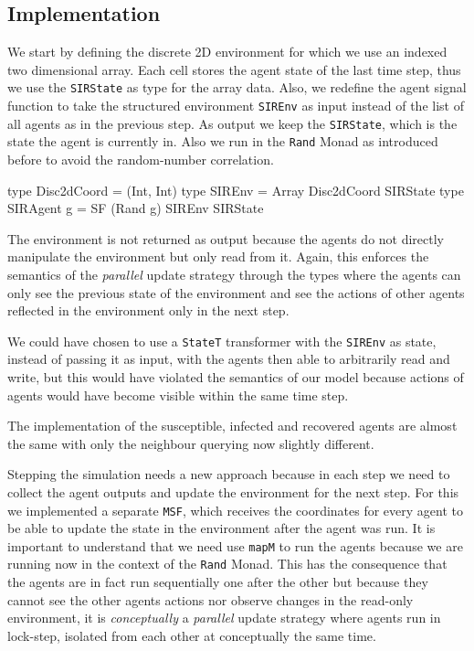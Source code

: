 \subsection{Implementation}
\label{sub:timedriven_thirdstep_impl}
We start by defining the discrete 2D environment for which we use an indexed two dimensional array. Each cell stores the agent state of the last time step, thus we use the \texttt{SIRState} as type for the array data. Also, we redefine the agent signal function to take the structured environment \texttt{SIREnv} as input instead of the list of all agents as in the previous step. As output we keep the \texttt{SIRState}, which is the state the agent is currently in. Also we run in the \texttt{Rand} Monad as introduced before to avoid the random-number correlation. 

\begin{HaskellCode}
type Disc2dCoord = (Int, Int)
type SIREnv      = Array Disc2dCoord SIRState
type SIRAgent g  = SF (Rand g) SIREnv SIRState
\end{HaskellCode}

The environment is not returned as output because the agents do not directly manipulate the environment but only read from it. Again, this enforces the semantics of the \textit{parallel} update strategy through the types where the agents can only see the previous state of the environment and see the actions of other agents reflected in the environment only in the next step.

We could have chosen to use a \texttt{StateT} transformer with the \texttt{SIREnv} as state, instead of passing it as input, with the agents then able to arbitrarily read and write, but this would have violated the semantics of our model because actions of agents would have become visible within the same time step.

The implementation of the susceptible, infected and recovered agents are almost the same with only the neighbour querying now slightly different. 

Stepping the simulation needs a new approach because in each step we need to collect the agent outputs and update the environment for the next step. For this we implemented a separate \texttt{MSF}, which receives the coordinates for every agent to be able to update the state in the environment after the agent was run. It is important to understand that we need use \texttt{mapM} to run the agents because we are running now in the context of the \texttt{Rand} Monad. This has the consequence that the agents are in fact run sequentially one after the other but because they cannot see the other agents actions nor observe changes in the read-only environment, it is \textit{conceptually} a \textit{parallel} update strategy where agents run in lock-step, isolated from each other at conceptually the same time.
  
